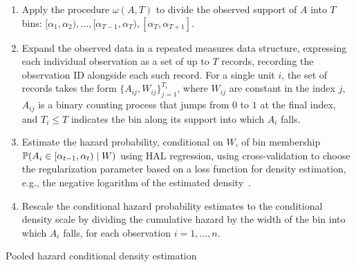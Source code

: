 \begin{algorithm}[H]
\label{alg:pooled_haz_dens}
\SetAlgoLined
{}
\BlankLine
\begin{enumerate}
\itemsep4pt
\item Apply the procedure $\omega(A, T)$ to divide the observed support of $A$
  into $T$ bins: $[\alpha_1, \alpha_2), \ldots, [\alpha_{T-1}, \alpha_T),
  [\alpha_T, \alpha_{T+1}]$.
\item Expand the observed data in a repeated measures data structure, expressing
  each individual observation as a set of up to $T$ records, recording the
  observation ID alongside each such record. For a single unit $i$, the set of
  records takes the form $\{A_{ij}, W_{ij}\}_{j=1}^{T_i}$, where $W_{ij}$ are
  constant in the index $j$, $A_{ij}$ is a binary counting process that jumps
  from $0$ to $1$ at the final index, and $T_i \leq T$ indicates the bin along
  its support into which $A_i$ falls.
\item Estimate the hazard probability, conditional on $W$, of bin membership
  $\mathbb{P}(A_i \in [\alpha_{t-1}, \alpha_t) \mid W)$ using HAL regression, using
  cross-validation to choose the regularization parameter based on a loss
  function for density estimation, e.g., the negative logarithm of the estimated
  density~\citep{dudoit2005asymptotics}.
\item Rescale the conditional hazard probability estimates to the conditional
  density scale by dividing the cumulative hazard by the width of the bin into
  which $A_i$ falls, for each observation $i = 1, \ldots, n$.
\end{enumerate}
\BlankLine
{}
\caption{Pooled hazard conditional density estimation}
\end{algorithm}

